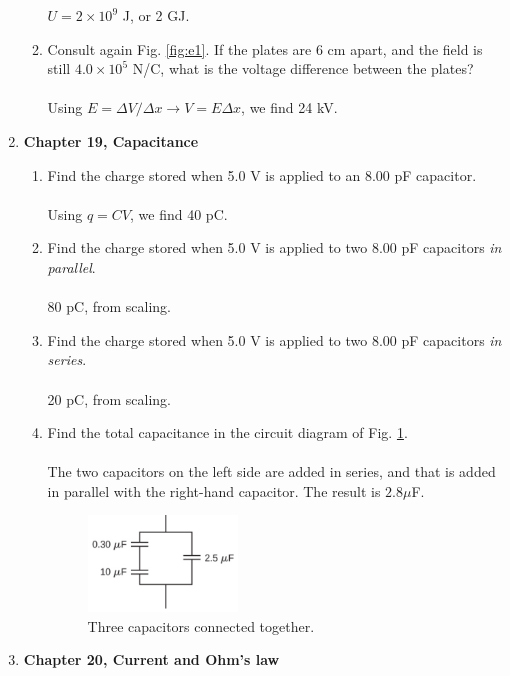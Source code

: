 \documentclass[10pt]{article}
\begin{document}
\begin{enumerate}
\begin{enumerate}
$U = 2 \times 10^{9}$ J, or 2 GJ. \\
\item Consult again Fig. \ref{fig:e1}.  If the plates are 6 cm apart, and the field is still $4.0 \times 10^5$ N/C, what is the voltage difference between the plates? \\ \\
Using $E = \Delta V/\Delta x \rightarrow V = E\Delta x$, we find 24 kV. \\
\end{enumerate}
\item \textbf{Chapter 19, Capacitance}
\begin{enumerate}
\item Find the charge stored when 5.0 V is applied to an 8.00 pF capacitor. \\ \\
Using $q = CV$, we find 40 pC. \\
\item Find the charge stored when 5.0 V is applied to two 8.00 pF capacitors \textit{in parallel}. \\ \\
80 pC, from scaling. \\
\item Find the charge stored when 5.0 V is applied to two 8.00 pF capacitors \textit{in series}. \\ \\
20 pC, from scaling. \\
\item Find the total capacitance in the circuit diagram of Fig. \ref{fig:c1}. \\ \\
The two capacitors on the left side are added in series, and that is added in parallel with the right-hand capacitor.  The result is $2.8 \mu$F. \\
\begin{figure}
\centering
\includegraphics[width=0.4\textwidth]{figures/c1.png}
\caption{\label{fig:c1} Three capacitors connected together.}
\end{figure}
\end{enumerate}
\item \textbf{Chapter 20, Current and Ohm's law}

\end{enumerate}
\end{document}
